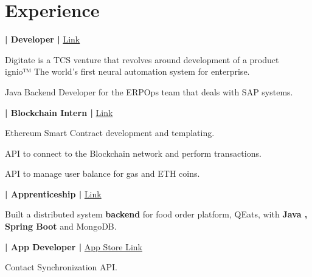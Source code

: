 \documentclass[]{deedy-resume-openfont}
\begin{document}
\begin{minipage}[t]{0.66\textwidth}


\section{Experience}
\textbf{| Developer | }\href{https://digitate.com/ignio-ai-erpops/}{Link}\\
\vspace{\topsep} %
\begin{tightemize}
\item Digitate is a TCS venture that revolves around development of a product \\ignio™ The world’s first neural automation system for enterprise.
\item Java Backend Developer for the ERPOps team that deals with SAP systems.
\end{tightemize}
\sectionsep

\textbf{| Blockchain Intern |  }\href{https://www.tcs.com/quartz-blockchain-solutions}{Link}\\
\begin{tightemize}
\item Ethereum Smart Contract development and templating.
\item API to connect to the Blockchain network and perform transactions.
\item API to manage user balance for gas and ETH coins.
\end{tightemize}
\sectionsep

\textbf{| Apprenticeship |  }\href{https://criodo.github.io/csod-2019-anugrahsinghal}{Link}\\
\begin{tightemize}
\item Built a distributed system \textbf{backend} for food order platform, QEats, with \textbf{Java , Spring Boot} and MongoDB.
\end{tightemize}
\sectionsep

\textbf{| App Developer | }\href{https://apps.apple.com/us/app/zoho-contact-manager/id705188406}{App Store Link}\\
\begin{tightemize}
\item Contact Synchronization API.
\end{tightemize}
\sectionsep


\end{minipage}
\end{document}
